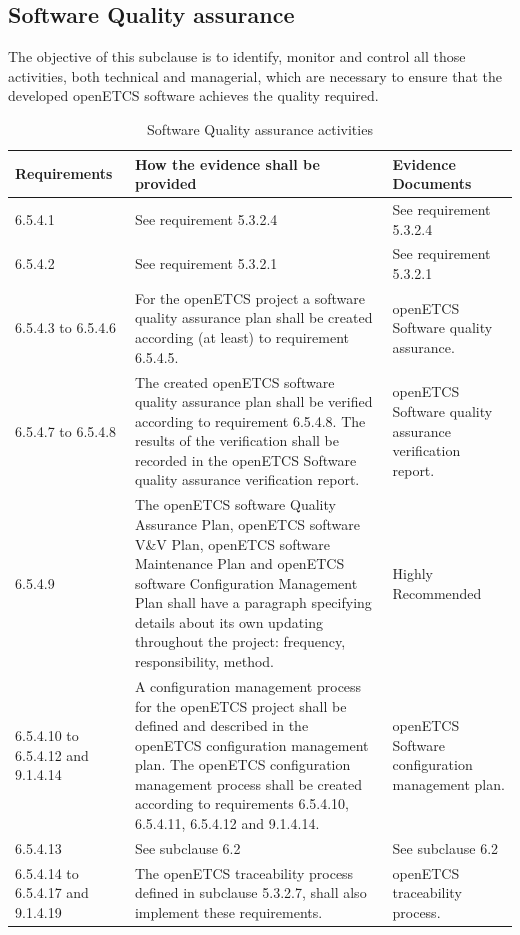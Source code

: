 \documentclass{template/openetcs_report}
\begin{document}
\subsection{Software Quality assurance}
\begin{flushleft}
The objective of this subclause is to identify, monitor and control all those activities, both technical and managerial, which are necessary to ensure that the developed openETCS software achieves the quality required. 
\end{flushleft}
{\footnotesize\sffamily\centering
\begin{longtable}{|p{2cm}|p{9cm}|p{3cm}|}
\caption{Software Quality assurance activities}\\
\hline
\bfseries Requirements & \bfseries How the evidence shall be provided & \bfseries Evidence Documents\\
\hline
\hline
\endhead
\hline
\endfoot

6.5.4.1 & See requirement 5.3.2.4 & See requirement 5.3.2.4\\ 
\hline
6.5.4.2 & See requirement 5.3.2.1 & See requirement 5.3.2.1\\ 
\hline
6.5.4.3 to 6.5.4.6 & For the openETCS project a software quality assurance plan shall be created according (at least) to requirement 6.5.4.5.
& openETCS Software quality assurance.\\ 
\hline
6.5.4.7 to 6.5.4.8 & The created openETCS software quality assurance plan shall be verified according to requirement 6.5.4.8. 
The results of the verification shall be recorded in the openETCS Software quality assurance verification report.
& openETCS Software quality assurance verification report.\\ 
\hline
6.5.4.9 & The openETCS software Quality Assurance Plan, openETCS software V\&V Plan, openETCS software Maintenance Plan and openETCS software Configuration Management Plan shall have a paragraph specifying details about its own updating throughout the project: frequency, responsibility, method. & Highly Recommended\\ 
\hline
6.5.4.10 to 6.5.4.12 and 9.1.4.14 & A configuration management process for the openETCS project shall be defined and described in the openETCS configuration management plan.
The openETCS configuration management process shall be created according to requirements 6.5.4.10, 6.5.4.11, 6.5.4.12 and 9.1.4.14. 
& openETCS Software configuration management plan.\\ 
\hline
6.5.4.13 & See subclause 6.2 & See subclause 6.2\\ 
\hline
6.5.4.14 to 6.5.4.17 and 9.1.4.19 & The openETCS traceability process defined in subclause 5.3.2.7, shall also implement these requirements.
& openETCS traceability process.\\ 
\hline
\end{longtable}}
\end{document}

